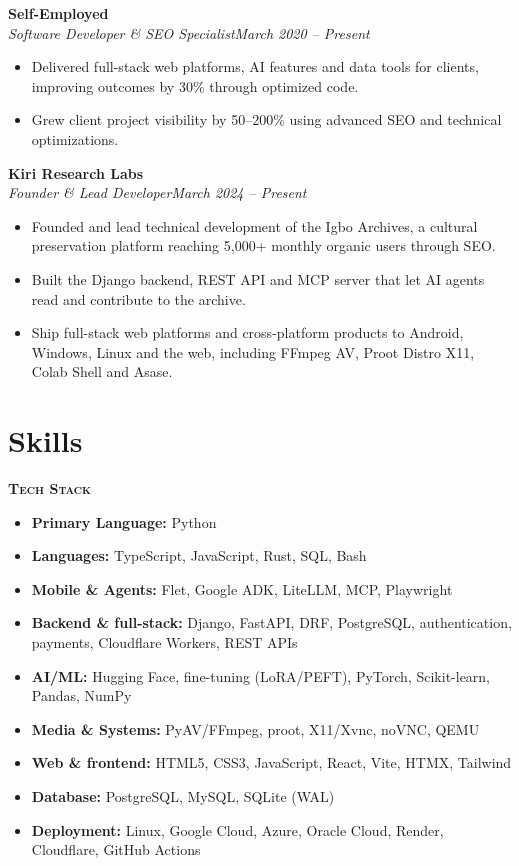 \documentclass[10pt,letterpaper]{article}
\newcommand{\role}[3]{\par\vspace{3pt}\textbf{#1}\\ \textit{#2}\hfill\textit{#3}\par}
\newcommand{\subhead}[1]{\par\vspace{4pt}\noindent\textbf{\textsc{#1}}\par\vspace{1pt}}
\begin{document}
\role{Self-Employed}{Software Developer \& SEO Specialist}{March 2020 -- Present}
\begin{itemize}
\item Delivered full-stack web platforms, AI features and data tools for clients, improving outcomes by 30\% through optimized code.
\item Grew client project visibility by 50--200\% using advanced SEO and technical optimizations.
\end{itemize}

\role{Kiri Research Labs}{Founder \& Lead Developer}{March 2024 -- Present}
\begin{itemize}
\item Founded and lead technical development of the Igbo Archives, a cultural preservation platform reaching 5,000+ monthly organic users through SEO.
\item Built the Django backend, REST API and MCP server that let AI agents read and contribute to the archive.
\item Ship full-stack web platforms and cross-platform products to Android, Windows, Linux and the web, including FFmpeg AV, Proot Distro X11, Colab Shell and Asase.
\end{itemize}

\section*{Skills}

\subhead{Tech Stack}
\begin{itemize}
\item \textbf{Primary Language:} Python
\item \textbf{Languages:} TypeScript, JavaScript, Rust, SQL, Bash
\item \textbf{Mobile \& Agents:} Flet, Google ADK, LiteLLM, MCP, Playwright
\item \textbf{Backend \& full-stack:} Django, FastAPI, DRF, PostgreSQL, authentication, payments, Cloudflare Workers, REST APIs
\item \textbf{AI/ML:} Hugging Face, fine-tuning (LoRA/PEFT), PyTorch, Scikit-learn, Pandas, NumPy
\item \textbf{Media \& Systems:} PyAV/FFmpeg, proot, X11/Xvnc, noVNC, QEMU
\item \textbf{Web \& frontend:} HTML5, CSS3, JavaScript, React, Vite, HTMX, Tailwind
\item \textbf{Database:} PostgreSQL, MySQL, SQLite (WAL)
\item \textbf{Deployment:} Linux, Google Cloud, Azure, Oracle Cloud, Render, Cloudflare, GitHub Actions
\end{itemize}
\end{document}
